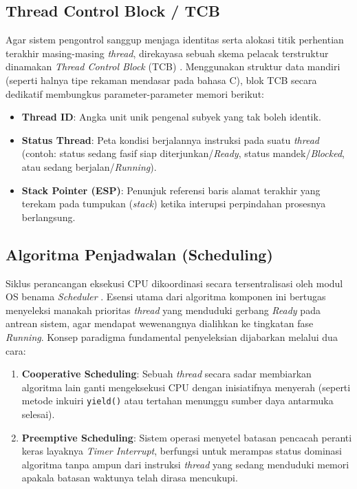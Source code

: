 \subsection{Thread Control Block / TCB}
Agar sistem pengontrol sanggup menjaga identitas serta alokasi titik perhentian terakhir masing-masing \textit{thread}, direkayasa sebuah skema pelacak terstruktur dinamakan \textit{Thread Control Block} (TCB) \cite{Silberschatz2018}. Menggunakan struktur data mandiri (seperti halnya tipe rekaman mendasar pada bahasa C), blok TCB secara dedikatif membungkus parameter-parameter memori berikut:
\begin{itemize}
    \item \textbf{Thread ID}: Angka unit unik pengenal subyek yang tak boleh identik.
    \item \textbf{Status Thread}: Peta kondisi berjalannya instruksi pada suatu \textit{thread} (contoh: status sedang fasif siap diterjunkan/\textit{Ready}, status mandek/\textit{Blocked}, atau sedang berjalan/\textit{Running}).
    \item \textbf{Stack Pointer (ESP)}: Penunjuk referensi baris alamat terakhir yang terekam pada tumpukan (\textit{stack}) ketika interupsi perpindahan prosesnya berlangsung.
\end{itemize}

\subsection{Algoritma Penjadwalan (Scheduling)}
Siklus perancangan eksekusi CPU dikoordinasi secara tersentralisasi oleh modul OS benama \textit{Scheduler} \cite{Silberschatz2018}. Esensi utama dari algoritma komponen ini bertugas menyeleksi manakah prioritas \textit{thread} yang menduduki gerbang \textit{Ready} pada antrean sistem, agar mendapat wewenangnya dialihkan ke tingkatan fase \textit{Running}. Konsep paradigma fundamental penyeleksian dijabarkan melalui dua cara:
\begin{enumerate}
    \item \textbf{Cooperative Scheduling}: Sebuah \textit{thread} secara sadar membiarkan algoritma lain ganti mengeksekusi CPU dengan inisiatifnya menyerah (seperti metode inkuiri \texttt{yield()} atau tertahan menunggu sumber daya antarmuka selesai).
    \item \textbf{Preemptive Scheduling}: Sistem operasi menyetel batasan pencacah peranti keras layaknya \textit{Timer Interrupt}, berfungsi untuk merampas status dominasi algoritma tanpa ampun dari instruksi \textit{thread} yang sedang menduduki memori apakala batasan waktunya telah dirasa mencukupi.
\end{enumerate}

